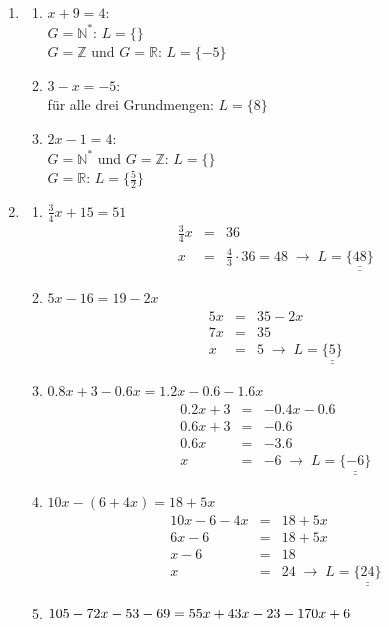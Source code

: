 \documentclass[%
11pt,%
twoside,%
titlepage,%
german,%
]{scrartcl}
\newcommand{\result}[1]{\underline{\underline{#1}}}
\begin{document}
\begin{enumerate}
\item
  \begin{enumerate}
  \item $\displaystyle x+9=4$: \\
    $G=\mathbb{N^*}$: $L=\{\}$ \\
    $G=\mathbb{Z}$ und $G=\mathbb{R}$: $L=\{-5\}$
  \item $\displaystyle 3-x=-5$: \\
    f\"ur alle drei Grundmengen: $L=\{8\}$
  \item $\displaystyle 2x-1=4$: \\
    $G=\mathbb{N^*}$ und $G=\mathbb{Z}$: $L=\{\}$ \\
    $G=\mathbb{R}$: $L=\{\frac{5}{2}\}$
  \end{enumerate}

\item
  \begin{enumerate}
  \item $\displaystyle \frac{3}{4}x + 15 = 51$
    \begin{eqnarray*}
      \frac{3}{4}x & = & 36 \\
      x & = & \frac{4}{3} \cdot 36 = 48 \;\to\; L=\result{\{48\}}
    \end{eqnarray*}
  \item $\displaystyle 5x-16 = 19-2x$ 
    \begin{eqnarray*}
      5x & = & 35-2x \\
      7x & = & 35 \\
      x & = & 5 \;\to\; L=\result{\{5\}}
    \end{eqnarray*}
  \item $\displaystyle 0.8x+3-0.6x=1.2x-0.6-1.6x$ 
    \begin{eqnarray*}
      0.2x + 3 & = & -0.4x-0.6 \\
      0.6x + 3 & = & -0.6 \\
      0.6x & = & -3.6 \\
      x & = & -6 \;\to\; L= \result{\{-6\}}
    \end{eqnarray*}
  \item $\displaystyle 10x-(6+4x)=18+5x$
    \begin{eqnarray*}
      10x-6-4x & = & 18+5x \\
      6x - 6 & = & 18 + 5x \\
      x - 6 & = & 18 \\
      x & = & 24 \;\to\; L=\result{\{24\}}
    \end{eqnarray*}
  \item $\displaystyle 105-72x-53-69 \\ =55x+43x-23-170x+6$

\end{enumerate}
\end{enumerate}
\end{document}
